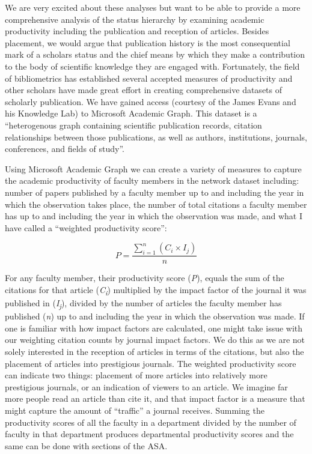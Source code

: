 \documentclass[12pt]{article}
\begin{document}
    We are very excited about these analyses but want to be able to provide a more comprehensive analysis of the status hierarchy by examining academic productivity including the publication and reception of articles. Besides placement, we would argue that publication history is the most consequential mark of a scholars status and the chief means by which they make a contribution to the body of scientific knowledge they are engaged with. Fortunately, the field of bibliometrics has established several accepted measures of productivity and other scholars have made great effort in creating comprehensive datasets of scholarly publication. We have gained access (courtesy of the James Evans and his Knowledge Lab) to Microsoft Academic Graph. This dataset is a ``heterogenous graph containing scientific publication records, citation relationships between those publications, as well as authors, institutions, journals, conferences, and fields of study''.
    
    Using Microsoft Academic Graph we can create a variety of measures to capture the academic productivity of faculty members in the network dataset including: number of papers published by a faculty member up to and including the year in which the observation takes place, the number of total citations a faculty member has up to and including the year in which the observation was made, and what I have called a ``weighted productivity score'':
    
    \begin{equation}
    P = \frac{ \sum_{i=1}^{n} (C_i \times I_j) }{n}
    \end{equation}
    
    \smallskip
    
    For any faculty member, their productivity score (\emph{P}), equals the sum of the citations for that article (\emph{C\textsubscript{i}}) multiplied by the impact factor of the journal it was published in (\emph{I\textsubscript{j}}), divided by the number of articles the faculty member has published (\emph{n}) up to and including the year in which the observation was made. If one is familiar with how impact factors are calculated, one might take issue with our weighting citation counts by journal impact factors. We do this as we are not solely interested in the reception of articles in terms of the citations, but also the placement of articles into prestigious journals. The weighted productivity score can indicate two things: placement of more articles into relatively more prestigious journals, or an indication of viewers to an article. We imagine far more people read an article than cite it, and that impact factor is a measure that might capture the amount of ``traffic'' a journal receives. Summing the productivity scores of all the faculty in a department divided by the number of faculty in that department produces departmental productivity scores and the same can be done with sections of the ASA.
\end{document}
